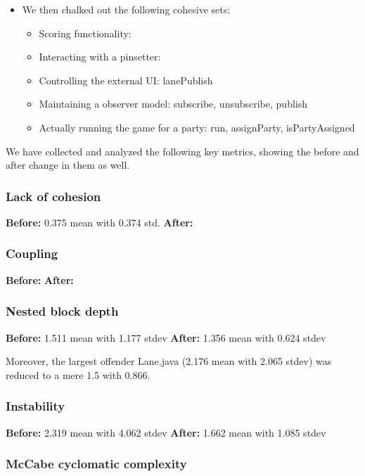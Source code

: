 \begin{itemize}
\item We then chalked out the following cohesive sets:
\begin{itemize}
\item Scoring functionality: 
\item Interacting with a pinsetter: 
\item Controlling the external UI: lanePublish
\item Maintaining a observer model: subscribe, unsubscribe, publish
\item Actually running the game for a party: run, assignParty, isPartyAssigned
\end{itemize}

\end{itemize}
We have collected and analyzed the following key metrics, showing the before and after change in them as well.

\subsubsection{Lack of cohesion}

\textbf{Before:} 0.375 mean with 0.374 std.
\textbf{After:}

\subsubsection{Coupling}
\textbf{Before:}
\textbf{After:}

\subsubsection{Nested block depth}
\textbf{Before:} 1.511 mean with 1.177 stdev
\textbf{After:} 1.356 mean with 0.624 stdev

Moreover, the largest offender Lane.java (2.176 mean with 2.065 stdev) was reduced to a mere 1.5 with 0.866.

\subsubsection{Instability}

\textbf{Before:} 2.319 mean with 4.062 stdev
\textbf{After:} 1.662 mean with 1.085 stdev


\subsubsection{McCabe cyclomatic complexity}

